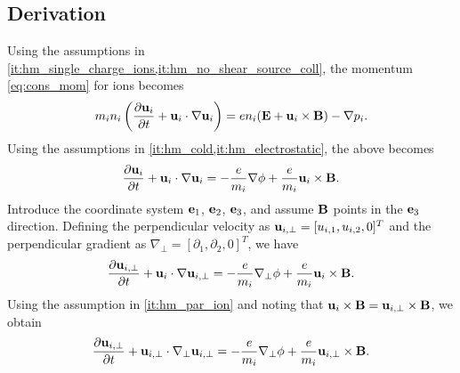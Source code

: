 \documentclass[oneside,a4paper,11pt]{report}
\begin{document}
\subsection{Derivation}
Using the assumptions in \cref{it:hm_single_charge_ions,it:hm_no_shear_source_coll}, the momentum \cref{eq:cons_mom} for ions becomes
\begin{equation}
    m_i n_i \left (\frac{\partial \mathbf{u}_i}{\partial t} + \mathbf{u}_i \cdot \nabla \mathbf{u}_i \right ) = e n_i (\mathbf{E} + \mathbf{u}_i \times \mathbf{B}) - \nabla p_i.
\end{equation}
Using the assumptions in \cref{it:hm_cold,it:hm_electrostatic}, the above becomes
\begin{equation}
    \frac{\partial \mathbf{u}_i}{\partial t} + \mathbf{u}_i \cdot \nabla \mathbf{u}_i = -\frac{e}{m_i} \nabla \phi + \frac{e}{m_i}\mathbf{u}_i \times \mathbf{B}.
\end{equation}
Introduce the coordinate system $\mathbf{e}_1$, $\mathbf{e}_2$, $\mathbf{e}_3$, and assume $\mathbf{B}$ points in the $\mathbf{e}_3$ direction. Defining the perpendicular velocity as $\mathbf{u}_{i,\perp} = [u_{i,1}, u_{i,2}, 0]^T$ and the perpendicular gradient as $\nabla_\perp = [\partial_1, \partial_2, 0]^T$, we have
\begin{equation}
    \frac{\partial \mathbf{u}_{i,\perp}}{\partial t} + \mathbf{u}_i \cdot \nabla \mathbf{u}_{i,\perp} = -\frac{e}{m_i} \nabla_\perp \phi + \frac{e}{m_i}\mathbf{u}_i \times \mathbf{B}.
\end{equation}
Using the assumption in \cref{it:hm_par_ion} and noting that $\mathbf{u}_{i} \times \mathbf{B} = \mathbf{u}_{i,\perp} \times \mathbf{B}$, we obtain
\begin{equation}
\label{eq:hm_momentum_perpendicular}
    \frac{\partial \mathbf{u}_{i,\perp}}{\partial t} + \mathbf{u}_{i,\perp} \cdot \nabla_\perp \mathbf{u}_{i,\perp} = -\frac{e}{m_i} \nabla_\perp \phi + \frac{e}{m_i} \mathbf{u}_{i,\perp} \times \mathbf{B}.
\end{equation}
\end{document}
